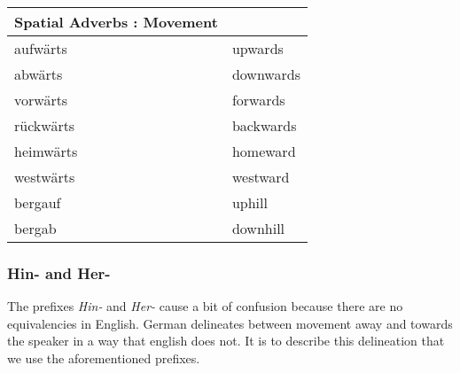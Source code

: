 \documentclass[a4paper,12pt]{article}
\begin{document}
\begin{adjustwidth}{2em}{0pt}
\begin{minipage}{0.4\textwidth}
\begin{tabular}{l|l}
\toprule
\rowcolor{goethe_green}
\multicolumn{2}{c}
{\color{white} \textbf{Spatial Adverbs : Movement} \color{black}} \\
\midrule

\rowcolor{white}     aufwärts  & upwards\\
\rowcolor{lightgray} abwärts   & downwards\\
\rowcolor{white}     vorwärts  & forwards\\
\rowcolor{lightgray} rückwärts & backwards\\
\rowcolor{white}     heimwärts & homeward\\
\rowcolor{lightgray} westwärts & westward\\
\rowcolor{white}     bergauf   & uphill\\
\rowcolor{lightgray} bergab    & downhill\\

\bottomrule
\end{tabular}
\vspace{0.3cm}
\newline
\end{minipage}

\subsubsection{\bf{Hin- and Her-}}
\begin{adjustwidth}{3em}{0pt}
\label{sec:hin_and_her_}

The prefixes \textit{Hin- }and \textit{Her-} cause a bit of confusion because
there are no equivalencies in English. German delineates between movement away
and towards the speaker in a way that english does not. It is to describe this
delineation that we use the aforementioned prefixes.\\


\end{adjustwidth}
\end{adjustwidth}
\end{document}
